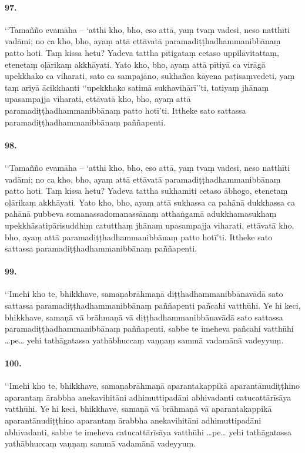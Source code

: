 \paragraph{97.}
‘‘Tamañño evamāha – ‘atthi kho, bho, eso attā, yaṃ tvaṃ vadesi, neso natthīti vadāmi; no ca kho, bho, ayaṃ attā ettāvatā paramadiṭṭhadhammanibbānaṃ patto hoti. Taṃ kissa hetu? Yadeva tattha pītigataṃ cetaso uppilāvitattaṃ, etenetaṃ oḷārikaṃ akkhāyati. Yato kho, bho, ayaṃ attā pītiyā ca virāgā upekkhako ca viharati, sato ca sampajāno, sukhañca kāyena paṭisaṃvedeti, yaṃ taṃ ariyā ācikkhanti ‘‘upekkhako satimā sukhavihārī’’ti, tatiyaṃ jhānaṃ upasampajja viharati, ettāvatā kho, bho, ayaṃ attā paramadiṭṭhadhammanibbānaṃ patto hotī’ti. Ittheke sato sattassa paramadiṭṭhadhammanibbānaṃ paññapenti.

\paragraph{98.}
‘‘Tamañño evamāha – ‘atthi kho, bho, eso attā, yaṃ tvaṃ vadesi, neso natthīti vadāmi; no ca kho, bho, ayaṃ attā ettāvatā paramadiṭṭhadhammanibbānaṃ patto hoti. Taṃ kissa hetu? Yadeva tattha sukhamiti cetaso ābhogo, etenetaṃ oḷārikaṃ akkhāyati. Yato kho, bho, ayaṃ attā sukhassa ca pahānā dukkhassa ca pahānā pubbeva somanassadomanassānaṃ atthaṅgamā adukkhamasukhaṃ upekkhāsatipārisuddhiṃ catutthaṃ jhānaṃ upasampajja viharati, ettāvatā kho, bho, ayaṃ attā paramadiṭṭhadhammanibbānaṃ patto hotī’ti. Ittheke sato sattassa paramadiṭṭhadhammanibbānaṃ paññapenti.

\paragraph{99.}
‘‘Imehi kho te, bhikkhave, samaṇabrāhmaṇā diṭṭhadhammanibbānavādā sato sattassa paramadiṭṭhadhammanibbānaṃ paññapenti pañcahi vatthūhi. Ye hi keci, bhikkhave, samaṇā vā brāhmaṇā vā diṭṭhadhammanibbānavādā sato sattassa paramadiṭṭhadhammanibbānaṃ paññapenti, sabbe te imeheva pañcahi vatthūhi …pe… yehi tathāgatassa yathābhuccaṃ vaṇṇaṃ sammā vadamānā vadeyyuṃ.

\paragraph{100.}
‘‘Imehi kho te, bhikkhave, samaṇabrāhmaṇā aparantakappikā aparantānudiṭṭhino aparantaṃ ārabbha anekavihitāni adhimuttipadāni abhivadanti catucattārīsāya vatthūhi. Ye hi keci, bhikkhave, samaṇā vā brāhmaṇā vā aparantakappikā aparantānudiṭṭhino aparantaṃ ārabbha anekavihitāni adhimuttipadāni abhivadanti, sabbe te imeheva catucattārīsāya vatthūhi …pe… yehi tathāgatassa yathābhuccaṃ vaṇṇaṃ sammā vadamānā vadeyyuṃ.

